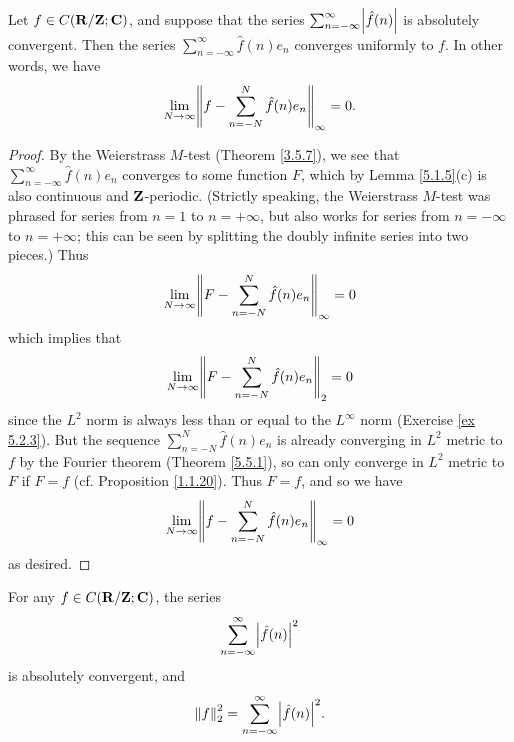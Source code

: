 \begin{theorem}\label{5.5.3}
    Let \(f \in C(\mathbf{R} / \mathbf{Z} ; \mathbf{C})\), and suppose that the series \(\sum_{n = -\infty}^\infty \abs{\hat{f}(n)}\) is absolutely convergent.
    Then the series \(\sum_{n = -\infty}^\infty \hat{f}(n) e_n\) converges uniformly to \(f\).
    In other words, we have
    \[
        \lim_{N \to \infty} \norm*{f - \sum_{n = -N}^N \hat{f}(n) e_n}_{\infty} = 0.
    \]
\end{theorem}

\begin{proof}
    By the Weierstrass \(M\)-test (Theorem \ref{3.5.7}), we see that \(\sum_{n = -\infty}^\infty \hat{f}(n) e_n\) converges to some function \(F\), which by Lemma \ref{5.1.5}(c) is also continuous and \(\mathbf{Z}\)-periodic.
    (Strictly speaking, the Weierstrass \(M\)-test was phrased for series from \(n = 1\) to \(n = +\infty\), but also works for series from \(n = -\infty\) to \(n = +\infty\);
    this can be seen by splitting the doubly infinite series into two pieces.)
    Thus
    \[
        \lim_{N \to \infty} \norm*{F - \sum_{n = -N}^N \hat{f}(n) e_n}_{\infty} = 0
    \]
    which implies that
    \[
        \lim_{N \to \infty} \norm*{F - \sum_{n = -N}^N \hat{f}(n) e_n}_2 = 0
    \]
    since the \(L^2\) norm is always less than or equal to the \(L^\infty\) norm (Exercise \ref{ex 5.2.3}).
    But the sequence \(\sum_{n = -N}^N \hat{f}(n) e_n\) is already converging in \(L^2\) metric to \(f\) by the Fourier theorem (Theorem \ref{5.5.1}), so can only converge in \(L^2\) metric to \(F\) if \(F = f\)
    (cf. Proposition \ref{1.1.20}).
    Thus \(F = f\), and so we have
    \[
        \lim_{N \to \infty} \norm*{f - \sum_{n = -N}^N \hat{f}(n) e_n}_{\infty} = 0
    \]
    as desired.
\end{proof}

\begin{theorem}\label{5.5.4}
    For any \(f \in C(\mathbf{R} / \mathbf{Z} ; \mathbf{C})\), the series
    \[
        \sum_{n = -\infty}^\infty \abs{\hat{f}(n)}^2
    \]
    is absolutely convergent, and
    \[
        \norm*{f}_2^2 = \sum_{n = -\infty}^\infty \abs{\hat{f}(n)}^2.
    \]
\end{theorem}

